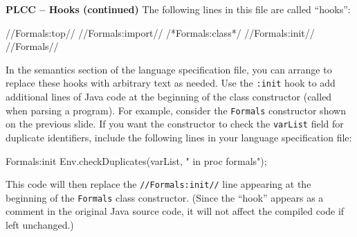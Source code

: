 \begin{minipage}[t]{\sw}
\slidenumber
\LARGE
{\bf PLCC -- Hooks (continued)}\exx
The following lines in this file are called ``hooks'':
{\Large
\begin{qv}
//Formals:top//
//Formals:import//
/*Formals:class*/
//Formals:init//
//Formals//
\end{qv}
}
In the semantics section of the language specification file,
you can arrange to replace these hooks with arbitrary text as needed.\exx
Use the \verb':init' hook
to add additional lines of Java code
at the beginning of the class constructor
(called when parsing a program).
For example, consider the \verb'Formals' constructor shown
on the previous slide.
If you want the constructor to check
the \verb'varList' field for duplicate identifiers,
include the following lines in your language specification file:
{\Large
\begin{qv}
Formals:init
    Env.checkDuplicates(varList, " in proc formals");
\end{qv}
}
This code will then replace the {\Large \verb'//Formals:init//'} line
appearing at the beginning of the \verb'Formals' class constructor.
(Since the ``hook'' appears as a comment in the original Java source code,
it will not affect the compiled code if left unchanged.)
\end{minipage}
\clearpage
